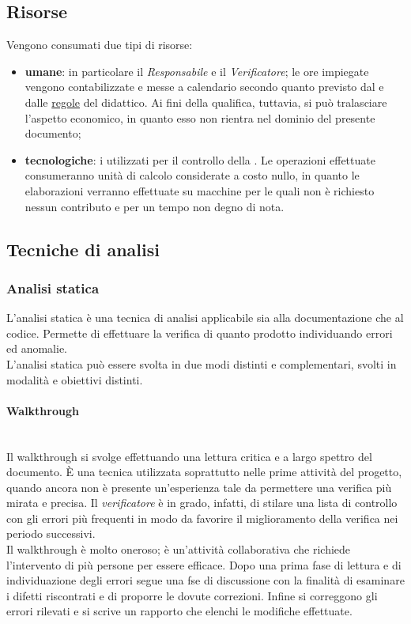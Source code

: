 \subsection{Risorse}
Vengono consumati due tipi di risorse:
\begin{itemize}
	\item \textbf{umane}: in particolare il \textit{Responsabile} e il \textit{Verificatore}; le ore impiegate vengono contabilizzate e messe a calendario secondo quanto previsto dal \PianoDiProgetto{} e dalle \href{http://www.math.unipd.it/~tullio/IS-1/2015/Dispense/PD01.pdf}{regole} del  didattico. Ai fini della qualifica, tuttavia, si può tralasciare l'aspetto economico, in quanto esso non rientra nel dominio del presente documento;
		\item \textbf{tecnologiche}: i  utilizzati per il controllo della . Le operazioni effettuate  consumeranno unità di calcolo considerate a costo nullo, in quanto le elaborazioni verranno effettuate su macchine per le quali non è richiesto nessun contributo e per un tempo non degno di nota.
\end{itemize}

\subsection{Tecniche di analisi}
\subsubsection{Analisi statica}
L'analisi statica è una tecnica di analisi applicabile sia alla documentazione che al codice. Permette di effettuare la verifica di quanto prodotto individuando errori ed anomalie. \\
L'analisi statica può essere svolta in due modi distinti e complementari, svolti in modalità e obiettivi distinti.
\paragraph{Walkthrough} \mbox{} \\
Il walkthrough si svolge effettuando una lettura critica e a largo spettro del documento. È una tecnica utilizzata soprattutto nelle prime attività del progetto, quando ancora non è presente un'esperienza tale da permettere una verifica più mirata e precisa. Il \textit{verificatore} è in grado, infatti, di stilare una lista di controllo con gli errori più frequenti in modo da favorire il miglioramento della verifica nei periodo successivi. \\
Il walkthrough è molto oneroso; è un'attività collaborativa che richiede l'intervento di più persone per essere efficace. Dopo una prima fase di lettura e di individuazione degli errori segue una fse di discussione con la finalità di esaminare i difetti riscontrati e di proporre le dovute correzioni. Infine si correggono gli errori rilevati e si scrive un rapporto che elenchi le modifiche effettuate. 

